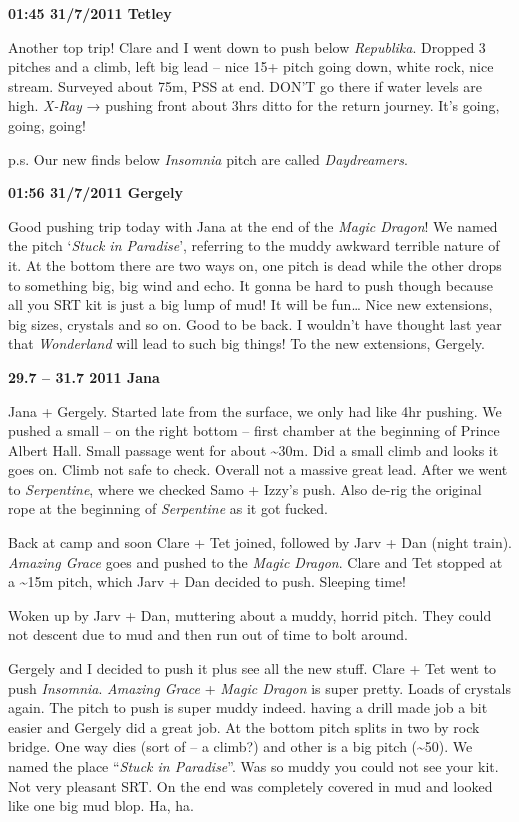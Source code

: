 \textbf{01:45 31/7/2011 Tetley}

Another top trip! Clare and I went down to push below \emph{Republika}.
Dropped 3 pitches and a climb, left big lead -- nice 15+ pitch going
down, white rock, nice stream. Surveyed about 75m, PSS at end. DON'T go
there if water levels are high. \emph{X-Ray} → pushing front about 3hrs
ditto for the return journey. It's going, going, going!

p.s. Our new finds below \emph{Insomnia} pitch are called
\emph{Daydreamers}.

\textbf{01:56 31/7/2011 Gergely}

Good pushing trip today with Jana at the end of the \emph{Magic Dragon}!
We named the pitch `\emph{Stuck in Paradise}', referring to the muddy
awkward terrible nature of it. At the bottom there are two ways on, one
pitch is dead while the other drops to something big, big wind and echo.
It gonna be hard to push though because all you SRT kit is just a big
lump of mud! It will be fun\ldots{} Nice new extensions, big sizes,
crystals and so on. Good to be back. I wouldn't have thought last year
that \emph{Wonderland} will lead to such big things! To the new
extensions, Gergely.

\textbf{29.7 -- 31.7 2011 Jana}

Jana + Gergely. Started late from the surface, we only had like 4hr
pushing. We pushed a small -- on the right bottom -- first chamber at
the beginning of Prince Albert Hall. Small passage went for about
\textasciitilde{}30m. Did a small climb and looks it goes on. Climb not
safe to check. Overall not a massive great lead. After we went to
\emph{Serpentine}, where we checked Samo + Izzy's push. Also de-rig the
original rope at the beginning of \emph{Serpentine} as it got fucked.

Back at camp and soon Clare + Tet joined, followed by Jarv + Dan (night
train). \emph{Amazing Grace} goes and pushed to the \emph{Magic Dragon}.
Clare and Tet stopped at a \textasciitilde{}15m pitch, which Jarv + Dan
decided to push. Sleeping time!

Woken up by Jarv + Dan, muttering about a muddy, horrid pitch. They
could not descent due to mud and then run out of time to bolt around.

Gergely and I decided to push it plus see all the new stuff. Clare + Tet
went to push \emph{Insomnia}. \emph{Amazing Grace} + \emph{Magic Dragon}
is super pretty. Loads of crystals again. The pitch to push is super
muddy indeed. having a drill made job a bit easier and Gergely did a
great job. At the bottom pitch splits in two by rock bridge. One way
dies (sort of -- a climb?) and other is a big pitch
(\textasciitilde{}50). We named the place ``\emph{Stuck in Paradise}''.
Was so muddy you could not see your kit. Not very pleasant SRT. On the
end was completely covered in mud and looked like one big mud blop. Ha,
ha.

